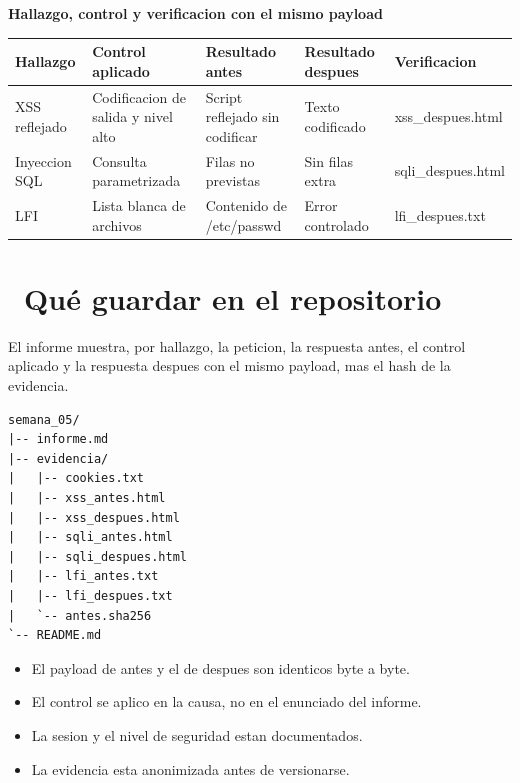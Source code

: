 \documentclass[11pt,a4paper]{article}
\newcommand{\iconotexto}[2]{\textcolor{cyanNeon}{\faIcon{#1}}~#2}
\begin{document}
\begin{center}
\begin{minipage}{\linewidth}
\centering
{\footnotesize
\textbf{Hallazgo, control y verificacion con el mismo payload}\par\smallskip
\begin{tabular}{@{}>{\raggedright\arraybackslash}p{2.20cm}>{\raggedright\arraybackslash}p{3.40cm}>{\raggedright\arraybackslash}p{2.80cm}>{\raggedright\arraybackslash}p{2.80cm}>{\raggedright\arraybackslash}p{2.80cm}@{}}
\toprule
\textbf{Hallazgo} & \textbf{Control aplicado} & \textbf{Resultado antes} & \textbf{Resultado despues} & \textbf{Verificacion} \\
\midrule
XSS reflejado & Codificacion de salida y nivel alto & Script reflejado sin codificar & Texto codificado & xss\_despues.html \\
Inyeccion SQL & Consulta parametrizada & Filas no previstas & Sin filas extra & sqli\_despues.html \\
LFI & Lista blanca de archivos & Contenido de /etc/passwd & Error controlado & lfi\_despues.txt \\
\bottomrule
\end{tabular}
}
\par{}
\end{minipage}
\end{center}

\section{\iconotexto{box-open}{Qué guardar en el repositorio}}

El informe muestra, por hallazgo, la peticion, la respuesta antes, el control aplicado y la respuesta despues con el mismo payload, mas el hash de la evidencia.

\begin{lstlisting}[style=estiloCodigo]
semana_05/
|-- informe.md
|-- evidencia/
|   |-- cookies.txt
|   |-- xss_antes.html
|   |-- xss_despues.html
|   |-- sqli_antes.html
|   |-- sqli_despues.html
|   |-- lfi_antes.txt
|   |-- lfi_despues.txt
|   `-- antes.sha256
`-- README.md
\end{lstlisting}

\begin{itemize}[leftmargin=1.4em,itemsep=2pt,topsep=3pt]
  \item El payload de antes y el de despues son identicos byte a byte.
  \item El control se aplico en la causa, no en el enunciado del informe.
  \item La sesion y el nivel de seguridad estan documentados.
  \item La evidencia esta anonimizada antes de versionarse.
\end{itemize}
\end{document}
